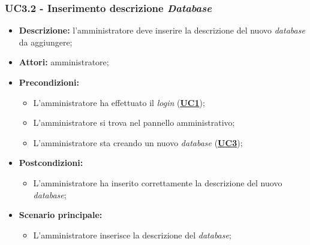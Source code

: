 \subsubsection{UC3.2 - Inserimento descrizione \textit{Database}}
\label{sec:UC3.2}
\begin{itemize}
	\item \textbf{Descrizione:} l’amministratore deve inserire la descrizione del nuovo \textit{database} da aggiungere;
	\item \textbf{Attori:} amministratore;
	\item \textbf{Precondizioni:} 
	\begin{itemize}
		\item L’amministratore ha effettuato il \textit{login} (\hyperref[sec:UC1]{\textbf{UC1}});
		\item L’amministratore si trova nel pannello amministrativo;
		\item L’amministratore sta creando un nuovo \textit{database} (\hyperref[sec:UC3]{\textbf{UC3}});
	\end{itemize}
	\item \textbf{Postcondizioni:} 
	\begin{itemize}
		\item L'amministratore ha inserito correttamente la descrizione del nuovo \textit{database};
	\end{itemize}
	\item \textbf{Scenario principale:} 
	\begin{itemize}
		\item L’amministratore inserisce la descrizione del \textit{database};
	\end{itemize}
\end{itemize}

